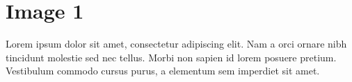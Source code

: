 \chapter{Image 1}
\label{app:appendix1}

Lorem ipsum dolor sit amet, consectetur adipiscing elit. Nam a orci ornare nibh tincidunt molestie sed nec tellus. Morbi non sapien id lorem posuere pretium. Vestibulum commodo cursus purus, a elementum sem imperdiet sit amet.

\begin{center}
\end{center}
